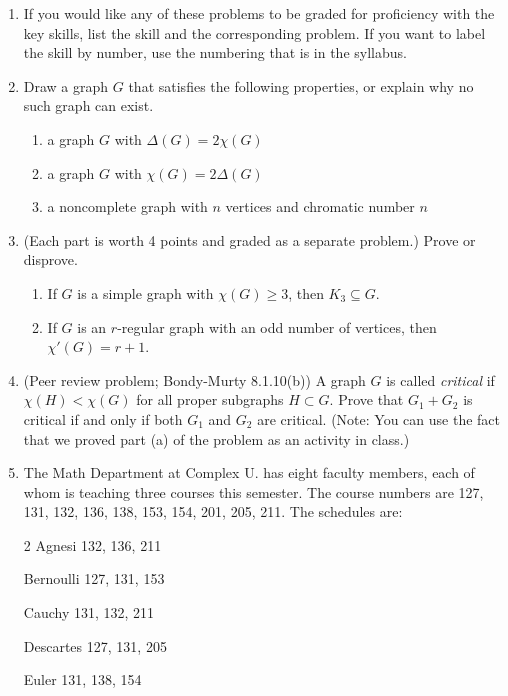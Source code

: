 \documentclass[12pt]{article}
\begin{document}
\begin{enumerate}
\item[0.] If you would like any of these problems to be graded for proficiency with the key skills, list the skill and the corresponding problem.  If you want to label the skill by number, use the numbering that is in the syllabus.

\item Draw a graph $G$ that satisfies the following properties, or explain why no such graph can exist.
\begin{enumerate}
\item a graph $G$ with $\Delta(G) = 2\chi (G)$
\item a graph $G$ with $\chi (G) = 2 \Delta (G)$
\item a noncomplete graph with $n$ vertices and chromatic number $n$
\end{enumerate}

    \item(Each part is worth 4 points and
graded as a separate problem.) Prove or disprove.

\begin{enumerate}
\item If $G$ is a simple graph with $\chi(G)\ge3$, then $K_3\subseteq G$. 
\item If $G$ is an $r$-regular graph with an odd number of vertices, then $\chi'(G)=r+1$.
\end{enumerate}
   
   \item (Peer review problem; Bondy-Murty 8.1.10(b)) A graph $G$ is called \emph{critical} if $\chi(H)<\chi(G)$ for all proper subgraphs $H\subset G$. Prove that $G_1+G_2$ is critical if and only if both $G_1$ and $G_2$ are critical. (Note: You can use the fact that we proved part (a) of the problem as an activity in class.)
   
   
       \item The Math Department at Complex U. has eight faculty members, each of whom is teaching three courses this semester. The course numbers are 127, 131, 132, 136, 138, 153, 154, 201, 205, 211. The schedules are:

\begin{multicols}{2} 
Agnesi 132, 136, 211 

Bernoulli 127, 131, 153 

Cauchy 131, 132, 211 

Descartes 127, 131, 205

Euler 131, 138, 154


\end{multicols}
\end{enumerate}
\end{document}
